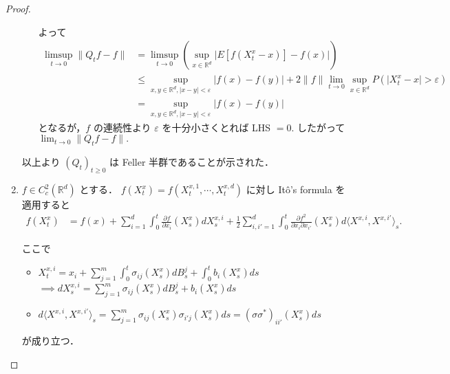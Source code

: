 \documentclass{jsarticle}
\begin{document}
\begin{proof}
\begin{enumerate}[label=(\arabic*)]
\begin{enumerate}[label=(\roman*)]
            よって
            \begin{align}
                \limsup_{t\to0}\lVert Q_{t}f-f\rVert
                &= \limsup_{t\to0}(\sup_{x\in\mathbb{R}^d}\lvert E[f(X_{t}^{x}-x)]-f(x)\rvert) \\
                &\le \sup_{x, y\in\mathbb{R}^d, \lvert x-y\rvert<\varepsilon}\lvert f(x)-f(y)\rvert
                + 2\lVert f\rVert\lim_{t\to0}\sup_{x\in\mathbb{R}^d}P(\lvert X_{t}^{x}-x\rvert>\varepsilon) \\
                &= \sup_{x, y\in\mathbb{R}^d, \lvert x-y\rvert<\varepsilon}\lvert f(x)-f(y)\rvert
            \end{align}
            となるが，$f$ の連続性より $\varepsilon$ を十分小さくとれば LHS $=0.$
            したがって $\lim_{t\to0}\lVert Q_{t}f-f\rVert.$
        \end{enumerate}

        以上より $(Q_{t})_{t\ge0}$ は Feller 半群であることが示された．
        
        \item
        $f\in C_{c}^2(\mathbb{R}^d)$ とする．
        $f(X_{t}^{x})=f(X_{t}^{x, 1},\dotsb, X_{t}^{x, d})$ に対し It\^{o}'s formula を適用すると
        \begin{align}
            f(X_{t}^{x})
            &= f(x)
            + \sum_{i=1}^{d}\int_{0}^{t}\frac{\partial f}{\partial x_{i}}(X_{s}^{x})dX_{s}^{x, i}
            + \frac{1}{2}\sum_{i, i'=1}^{d}\int_{0}^{t}\frac{\partial f^2}{\partial x_{i}\partial x_{i'}}(X_{s}^{x})d\langle X^{x, i}, X^{x, i'}\rangle_{s}.
        \end{align}

        ここで
        \begin{itemize}
            \item 
            $\displaystyle X_{t}^{x, i}
            = x_i
            + \sum_{j=1}^{m}\int_{0}^{t}\sigma_{ij}(X_{s}^{x})dB_{s}^{j}
            + \int_{0}^{t}b_{i}(X_{s}^{x})ds$ \\
            $\displaystyle \implies dX_{s}^{x, i}
            = \sum_{j=1}^{m}\sigma_{ij}(X_{s}^{x})dB_{s}^{j}
            + b_{i}(X_{s}^{x})ds$
            \item 
            $\displaystyle d\langle X^{x, i}, X^{x, i'}\rangle_{s}
            = \sum_{j=1}^{m}\sigma_{ij}(X_{s}^{x})\sigma_{i'j}(X_{s}^{x})ds
            = (\sigma\sigma^{\ast})_{ii'}(X_{s}^{x})ds$
        \end{itemize}
        が成り立つ．


\end{enumerate}
\end{proof}
\end{document}
